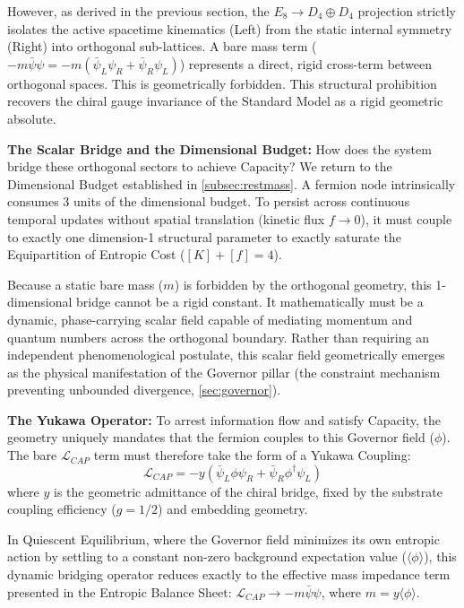 However, as derived in the previous section, the $E_8 \to D_4 \oplus D_4$ projection strictly isolates the active spacetime kinematics (Left) from the static internal symmetry (Right) into orthogonal sub-lattices. A bare mass term ($-m\bar{\psi}\psi = -m(\bar{\psi}_L\psi_R + \bar{\psi}_R\psi_L)$) represents a direct, rigid cross-term between orthogonal spaces. This is geometrically forbidden. This structural prohibition recovers the chiral gauge invariance of the Standard Model as a rigid geometric absolute.

\textbf{The Scalar Bridge and the Dimensional Budget:} How does the system bridge these orthogonal sectors to achieve Capacity? We return to the Dimensional Budget established in \cref{subsec:restmass}. A fermion node intrinsically consumes 3 units of the dimensional budget. To persist across continuous temporal updates without spatial translation (kinetic flux $f \to 0$), it must couple to exactly one dimension-1 structural parameter to exactly saturate the Equipartition of Entropic Cost ($[K] + [f] = 4$).

Because a static bare mass ($m$) is forbidden by the orthogonal geometry, this 1-dimensional bridge cannot be a rigid constant. It mathematically must be a dynamic, phase-carrying scalar field capable of mediating momentum and quantum numbers across the orthogonal boundary. Rather than requiring an independent phenomenological postulate, this scalar field geometrically emerges as the physical manifestation of the Governor pillar (the constraint mechanism preventing unbounded divergence, \cref{sec:governor}).

\textbf{The Yukawa Operator:} To arrest information flow and satisfy Capacity, the geometry uniquely mandates that the fermion couples to this Governor field ($\phi$). The bare $\mathcal{L}_{CAP}$ term must therefore take the form of a Yukawa Coupling:
\begin{equation}
    \mathcal{L}_{CAP} = -y \left( \bar{\psi}_L \phi \psi_R + \bar{\psi}_R \phi^\dagger \psi_L \right) \label{eq:yukawa}
\end{equation}
where $y$ is the geometric admittance of the chiral bridge, fixed by the substrate coupling efficiency ($g=1/2$) and embedding geometry.

In Quiescent Equilibrium, where the Governor field minimizes its own entropic action by settling to a constant non-zero background expectation value ($\langle\phi\rangle$), this dynamic bridging operator reduces exactly to the effective mass impedance term presented in the Entropic Balance Sheet: $\mathcal{L}_{CAP} \to -m\bar{\psi}\psi$, where $m = y\langle\phi\rangle$.

